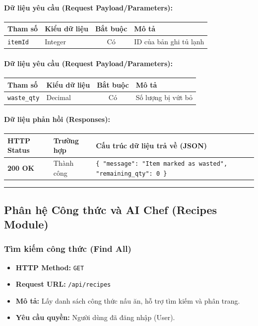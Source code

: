 \documentclass[12pt,a4paper]{article}
\begin{document}
\paragraph{Dữ liệu yêu cầu (Request Payload/Parameters):}
\begin{longtable}{|p{2.8cm}|p{2.2cm}|c|p{7.0cm}|}
\hline
\textbf{Tham số} & \textbf{Kiểu dữ liệu} & \textbf{Bắt buộc} & \textbf{Mô tả} \\ \hline
\endhead
\texttt{itemId} & Integer & Có & ID của bản ghi tủ lạnh \\ \hline
\end{longtable}

\paragraph{Dữ liệu yêu cầu (Request Payload/Parameters):}
\begin{longtable}{|p{2.8cm}|p{2.2cm}|c|p{7.0cm}|}
\hline
\textbf{Tham số} & \textbf{Kiểu dữ liệu} & \textbf{Bắt buộc} & \textbf{Mô tả} \\ \hline
\endhead
\texttt{waste\_qty} & Decimal & Có & Số lượng bị vứt bỏ \\ \hline
\end{longtable}

\paragraph{Dữ liệu phản hồi (Responses):}
\begin{longtable}{|p{2.8cm}|p{3.2cm}|p{8.0cm}|}
\hline
\textbf{HTTP Status} & \textbf{Trường hợp} & \textbf{Cấu trúc dữ liệu trả về (JSON)} \\ \hline
\endhead
\textbf{200 OK} & Thành công & \texttt{\{ "message": "Item marked as wasted", "remaining\_qty": 0 \}} \\ \hline
\end{longtable}

\vskip 0.4cm
\noindent\rule{\textwidth}{0.3pt}
\vskip 0.4cm

\subsection{Phân hệ Công thức và AI Chef (Recipes Module)}

\subsubsection{Tìm kiếm công thức (Find All)}
\begin{itemize}[leftmargin=*]
    \item \textbf{HTTP Method:} \texttt{GET}
    \item \textbf{Request URL:} \texttt{/api/recipes}
    \item \textbf{Mô tả:} Lấy danh sách công thức nấu ăn, hỗ trợ tìm kiếm và phân trang.
    \item \textbf{Yêu cầu quyền:} Người dùng đã đăng nhập (User).
\end{itemize}
\end{document}
